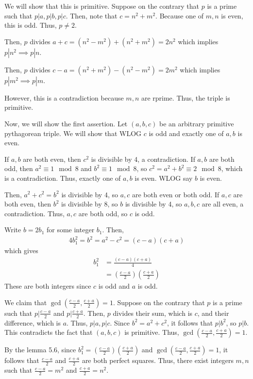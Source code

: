 \documentclass{article}
\begin{document}
We will show that this is primitive. Suppose on the contrary that $p$ is a prime such that $p|a, p|b, p|c$. Then, note that $c=n^2+m^2$. Because one of $m,n$ is even, this is odd. Thus, $p\neq 2$. 

Then, $p$ divides $a+c=(n^2-m^2)+(n^2+m^2)=2n^2$ which implies $p|n^2\implies p|n$. 

Then, $p$ divides $c-a=(n^2+m^2)-(n^2-m^2)=2m^2$ which implies $p|m^2\implies p|m$.

However, this is a contradiction because $m,n$ are rprime. Thus, the triple is primitive.

Now, we will show the first assertion. Let $(a,b,c)$ be an arbitrary primitive pythagorean triple. We will show that WLOG $c$ is odd and exactly one of $a,b$ is even.

If $a,b$ are both even, then $c^2$ is divisible by 4, a contradiction. If $a,b$ are both odd, then $a^2\equiv 1\mod 8$ and $b^2\equiv 1\mod 8$, so $c^2=a^2+b^2\equiv 2\mod 8$, which is a contradiction. Thus, exactly one of $a,b$ is even. WLOG say $b$ is even. 

Then, $a^2+c^2=b^2$ is divisible by 4, so $a,c$ are both even or both odd. If $a,c$ are both even, then $b^2$ is divisible by 8, so $b$ is divisible by 4, so $a,b,c$ are all even, a contradiction. Thus, $a,c$ are both odd, so $c$ is odd. 

Write $b=2b_1$ for some integer $b_1$. Then, \begin{align*}
    4b_1^2=b^2=a^2-c^2=(c-a)(c+a)
\end{align*}which gives \begin{align*}
    b_1^2&=\frac{(c-a)(c+a)}{4} \\
         &=\left(\frac{c-a}{2}\right)\left(\frac{c+a}{2}\right)
\end{align*}These are both integers since $c$ is odd and $a$ is odd. 

We claim that $\gcd(\frac{c-a}{2}, \frac{c+a}{2})=1$. Suppose on the contrary that $p$ is a prime such that $p|\frac{c-a}{2}$ and $p|\frac{c+a}{2}$. Then, $p$ divides their sum, which is $c$, and their difference, which is $a$. Thus, $p|a, p|c$. Since $b^2=a^2+c^2$, it follows that $p|b^2$, so $p|b$. This contradicts the fact that $(a,b,c)$ is primitive. Thus, $\gcd(\frac{c-a}{2}, \frac{c+a}{2})=1$.

By the lemma 5.6, since $b_1^2=\left(\frac{c-a}{2}\right)\left(\frac{c+a}{2}\right)$ and $\gcd(\frac{c-a}{2}, \frac{c+a}{2})=1$, it follows that $\frac{c-a}{2}$ and $\frac{c+a}{2}$ are both perfect squares. Thus, there exist integers $m,n$ such that $\frac{c-a}{2}=m^2$ and $\frac{c+a}{2}=n^2$. 
\end{document}
